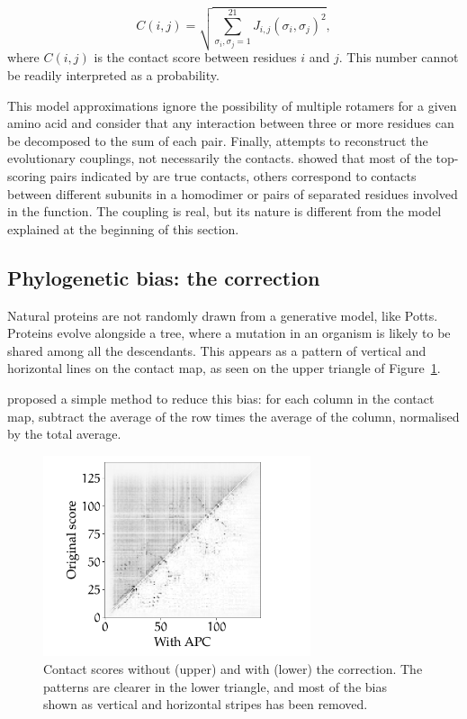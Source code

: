 \begin{equation*}
C(i, j) = \sqrt{\sum_{\sigma_i, \sigma_j=1}^{21} J_{i, j}(\sigma_i, \sigma_j)^2},
\end{equation*}
where $C(i, j)$ is the contact score between residues $i$ and $j$.
This number cannot be readily interpreted as a probability.

This model approximations ignore the possibility of multiple rotamers for a given amino acid 
and consider that any interaction between three or more residues can be decomposed to the sum of each pair.
Finally, \DCA{} attempts to reconstruct the evolutionary couplings, not necessarily the contacts.
\citet{contact_errors} showed that most of the top-scoring pairs indicated by \DCA{} are true contacts, others correspond to contacts between different subunits in a homodimer or pairs of separated residues involved in the function.
The coupling is real, but its nature is different from the model explained at the beginning of this section.

\subsection[Phylogenetic bias]{Phylogenetic bias: the \APC{} correction}
Natural proteins are not randomly drawn from a generative model, like Potts.
Proteins evolve alongside a tree, where a mutation in an organism is likely to be shared among all the descendants.
This appears as a pattern of vertical and horizontal lines on the contact map, as seen on the upper triangle of Figure~\ref{fig:apc}.

\citet{apc} proposed a simple method to reduce this bias: for each column in the contact map, subtract the average of the row times the average of the column, normalised by the total average.


\begin{figure}[hbt]
	\centering
	\includegraphics[trim={12mm 3mm 26mm 3mm},clip,width=0.7\textwidth]{bioinfo/figures/apc}
	\caption{Contact scores without (upper) and with (lower) the \APC{} correction.
	The patterns are clearer in the lower triangle, and most of the bias shown as vertical and horizontal stripes has been removed.}\label{fig:apc}
\end{figure}



